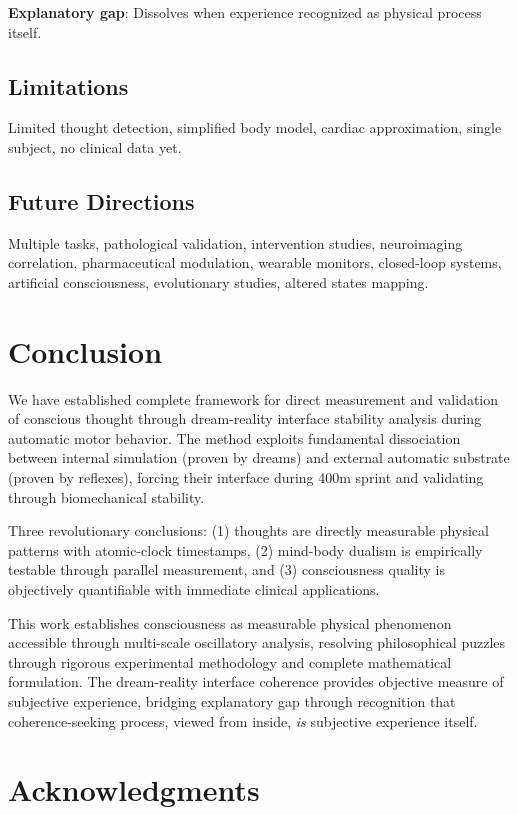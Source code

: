\documentclass[12pt,twocolumn]{article}
\theoremstyle{remark}
\begin{document}
\textbf{Explanatory gap}: Dissolves when experience recognized as physical process itself.

\subsection{Limitations}

Limited thought detection, simplified body model, cardiac approximation, single subject, no clinical data yet.

\subsection{Future Directions}

Multiple tasks, pathological validation, intervention studies, neuroimaging correlation, pharmaceutical modulation, wearable monitors, closed-loop systems, artificial consciousness, evolutionary studies, altered states mapping.

\section{Conclusion}

We have established complete framework for direct measurement and validation of conscious thought through dream-reality interface stability analysis during automatic motor behavior. The method exploits fundamental dissociation between internal simulation (proven by dreams) and external automatic substrate (proven by reflexes), forcing their interface during 400m sprint and validating through biomechanical stability.

Three revolutionary conclusions: (1) thoughts are directly measurable physical patterns with atomic-clock timestamps, (2) mind-body dualism is empirically testable through parallel measurement, and (3) consciousness quality is objectively quantifiable with immediate clinical applications.

This work establishes consciousness as measurable physical phenomenon accessible through multi-scale oscillatory analysis, resolving philosophical puzzles through rigorous experimental methodology and complete mathematical formulation. The dream-reality interface coherence provides objective measure of subjective experience, bridging explanatory gap through recognition that coherence-seeking process, viewed from inside, \textit{is} subjective experience itself.

\section*{Acknowledgments}
\end{document}
